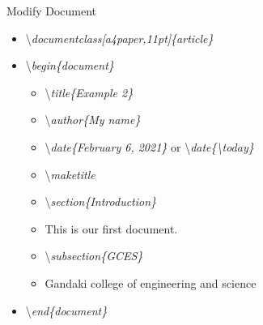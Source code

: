 \documentclass[11pt]{beamer}
\begin{document}
	\begin{frame}{Modify Document}
		\begin{itemize}
			\item[]\textbackslash\textit{documentclass[a4paper,11pt]\{article\}}
			\item[]\textbackslash\textit{begin\{document\}}
			\begin{itemize}
				\item[]\textbackslash\textit{title\{Example 2\}}
				\item[]\textbackslash\textit{author\{My name\}}
				\item[]\textbackslash\textit{date\{February 6, 2021\}} or \textbackslash\textit{date\{\textbackslash today\}}
				\item[]\textbackslash\textit{maketitle}
				\item[]\textbackslash\textit{section\{Introduction\}}
				\item[] This is our first document.
				\item[]\textbackslash\textit{subsection\{GCES\}}
				\item[] Gandaki college of engineering and science
			\end{itemize}
			\item[]\textbackslash\textit{end\{document\}}
		\end{itemize}		
	\end{frame}
\end{document}

